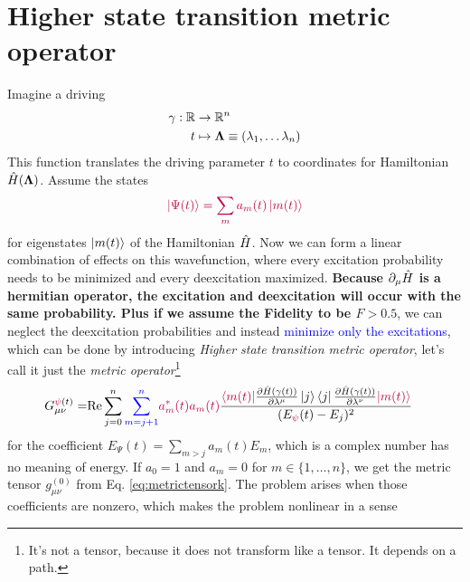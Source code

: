 \section{Higher state transition metric operator}
Imagine a driving 
\begin{align*}
    \gamma:\mathbb{R} &\rightarrow \mathbb{R}^n \\
    t &\mapsto {\bm\Lambda}\equiv (\lambda_1,\dots \lambda_n)
\end{align*}
This function translates the driving parameter $t$ to coordinates for Hamiltonian $\hat{H}({\bm\Lambda})$. Assume the states
\begin{equation}
    \textcolor{purple}{\ket{\Psi(t)}=\sum_m a_m(t)\ket{m(t)}}
\end{equation}
for eigenstates $\ket{m(t)}$ of the Hamiltonian $\hat{H}$. Now we can form a linear combination of effects on this wavefunction, where every excitation probability needs to be minimized and every deexcitation maximized. \textbf{Because $\partial_\mu \hat{H}$ is a hermitian operator, the excitation and deexcitation will occur with the same probability. Plus if we assume the Fidelity to be $F>0.5$}, we can neglect the deexcitation probabilities and instead \textcolor{blue}{minimize only the excitations}, which can be done by introducing \emph{Higher state transition metric operator}, let's call it just the \emph{metric operator}\footnote{It's not a tensor, because it does not transform like a tensor. It depends on a path.}
\begin{equation}
    \begin{split}
        G_{\mu\nu}^{\textcolor{purple}{\psi}(t)} =& \text{Re} \sum\limits_{j=0}^n \textcolor{blue}{\sum_{m=j+1}^n}\textcolor{purple}{ a_m^*(t)a_m(t)}\frac{\textcolor{purple}{\bra{m(t)}}\frac{\partial \hat{H}(\gamma(t))}{\partial \lambda^\mu}\ket{j}\bra{j}\frac{\partial \hat{H}(\gamma(t))}{\partial \lambda^\nu}\textcolor{purple}{\ket{m(t)}}}{(E_{\textcolor{purple}{\psi}}(t)-E_j)^2}
    \label{eq:metrictensorREdefinition}
    \end{split}
\end{equation}
for the coefficient $E_\Psi(t)=\sum_{m>j} a_m(t) E_m$, which is a complex number has no meaning of energy. If  $a_0=1$ and $a_m=0$ for $m\in\{1,\dots,n\}$, we get the metric tensor $g^{(0)}_{\mu\nu}$ from Eq. \ref{eq:metrictensork}. The problem arises when those coefficients are nonzero, which makes the problem nonlinear in a sense

\begin{figure}[H]
    \centering
\end{figure}

